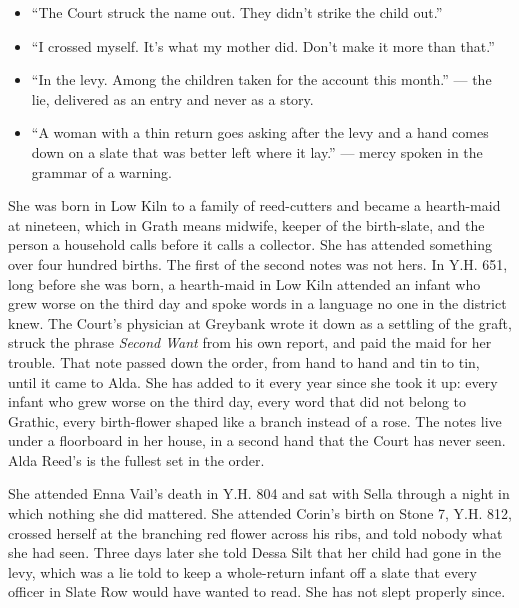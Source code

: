 \documentclass{design/chronicle}
\begin{document}
{\begin{itemize}[leftmargin=1.4em,itemsep=1pt,topsep=3pt,parsep=0pt]
\item “The Court struck the name out. They didn’t strike the child out.”

\item “I crossed myself. It’s what my mother did. Don’t make it more than that.”

\item “In the levy. Among the children taken for the account this month.” --- the lie, delivered as an entry and never as a story.

\item “A woman with a thin return goes asking after the levy and a hand comes down on a slate that was better left where it lay.” --- mercy spoken in the grammar of a warning.

\end{itemize}

She was born in Low Kiln to a family of reed-cutters and became a hearth-maid at nineteen, which in Grath means midwife, keeper of the birth-slate, and the person a household calls before it calls a collector. She has attended something over four hundred births. The first of the second notes was not hers. In Y.H. 651, long before she was born, a hearth-maid in Low Kiln attended an infant who grew worse on the third day and spoke words in a language no one in the district knew. The Court’s physician at Greybank wrote it down as a settling of the graft, struck the phrase \emph{Second Want} from his own report, and paid the maid for her trouble. That note passed down the order, from hand to hand and tin to tin, until it came to Alda. She has added to it every year since she took it up: every infant who grew worse on the third day, every word that did not belong to Grathic, every birth-flower shaped like a branch instead of a rose. The notes live under a floorboard in her house, in a second hand that the Court has never seen. Alda Reed’s is the fullest set in the order.

She attended Enna Vail’s death in Y.H. 804 and sat with Sella through a night in which nothing she did mattered. She attended Corin’s birth on Stone 7, Y.H. 812, crossed herself at the branching red flower across his ribs, and told nobody what she had seen. Three days later she told Dessa Silt that her child had gone in the levy, which was a lie told to keep a whole-return infant off a slate that every officer in Slate Row would have wanted to read. She has not slept properly since.

}
\end{document}
